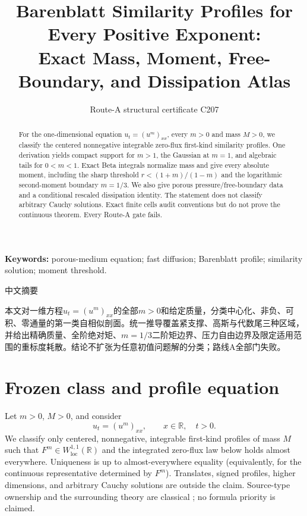 \documentclass[9pt]{extarticle}
\title{Barenblatt Similarity Profiles for Every Positive Exponent:\\
Exact Mass, Moment, Free-Boundary, and Dissipation Atlas}
\author{Route-A structural certificate C207}
\date{}
\newcommand{\R}{\mathbb R}
\begin{document}
\maketitle
\begin{abstract}
For the one-dimensional equation $u_t=(u^m)_{xx}$, every $m>0$ and mass
$M>0$, we classify the centered nonnegative integrable zero-flux first-kind
similarity profiles.  One derivation yields compact support for $m>1$, the
Gaussian at $m=1$, and algebraic tails for $0<m<1$.  Exact Beta integrals
normalize mass and give every absolute moment, including the sharp threshold
$r<(1+m)/(1-m)$ and the logarithmic second-moment boundary $m=1/3$.  We also
give porous pressure/free-boundary data and a conditional rescaled
dissipation identity.  The statement does not classify arbitrary Cauchy
solutions.  Exact finite cells audit conventions but do not prove the
continuous theorem.  Every Route-A gate fails.
\end{abstract}
\noindent\textbf{Keywords:} porous-medium equation; fast diffusion;
Barenblatt profile; similarity solution; moment threshold.

\begin{otherlanguage}{chinese-simplified}
\begin{center}{\large 中文摘要}\end{center}
本文对一维方程$u_t=(u^m)_{xx}$的全部$m>0$和给定质量，分类中心化、非负、可积、零通量的第一类自相似剖面。统一推导覆盖紧支撑、高斯与代数尾三种区域，并给出精确质量、全阶绝对矩、$m=1/3$二阶矩边界、压力自由边界及限定适用范围的重标度耗散。结论不扩张为任意初值问题解的分类；路线\foreignlanguage{english}{A}全部门失败。
\end{otherlanguage}

\section{Frozen class and profile equation}
Let $m>0$, $M>0$, and consider
\begin{equation}\label{eq:pde}
 u_t=(u^m)_{xx},\qquad x\in\R,\quad t>0.
\end{equation}
We classify only centered, nonnegative, integrable first-kind profiles of mass
$M$ such that $F^m\in W^{1,1}_{\mathrm{loc}}(\R)$ and the integrated
zero-flux law below holds almost everywhere.  Uniqueness is up to
almost-everywhere equality (equivalently, for the continuous representative
determined by $F^m$).  Translates, signed profiles, higher dimensions, and
arbitrary Cauchy solutions are outside the claim.  Source-type ownership and
the surrounding theory are classical
\cite{Barenblatt,Vazquez}; no formula priority is claimed.
\end{document}
